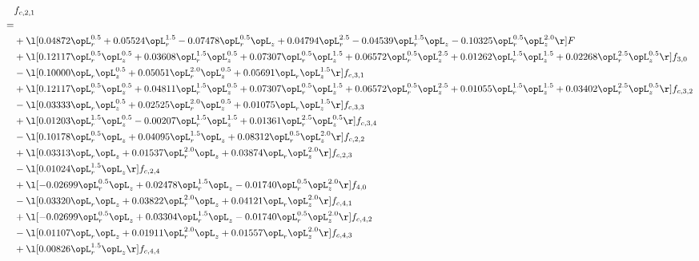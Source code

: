 \begin{alignat}{2} 
\label{eq:f_21_2} 
& f_{c,2,1} \nonumber \\ 
 = \\ 
& + \l[  0.04872 \opL_r^{0.5} +  0.05524 \opL_r^{1.5}   -0.07478 \opL_r^{0.5} \opL_z +  0.04794 \opL_r^{2.5}   -0.04539 \opL_r^{1.5} \opL_z   -0.10325 \opL_r^{0.5} \opL_z^{2.0}  \r] F \nonumber \\ 
& + \l[  0.12117 \opL_r^{0.5} \opL_z^{0.5} +  0.03608 \opL_r^{1.5} \opL_z^{0.5} +  0.07307 \opL_r^{0.5} \opL_z^{1.5} +  0.06572 \opL_r^{0.5} \opL_z^{2.5} +  0.01262 \opL_r^{1.5} \opL_z^{1.5} +  0.02268 \opL_r^{2.5} \opL_z^{0.5}  \r] f_{3,0} \nonumber \\ 
& - \l[  0.10000 \opL_r \opL_z^{0.5} +  0.05051 \opL_r^{2.0} \opL_z^{0.5} +  0.05691 \opL_r \opL_z^{1.5}  \r] f_{c,3,1} \nonumber \\ 
& + \l[  0.12117 \opL_r^{0.5} \opL_z^{0.5} +  0.04811 \opL_r^{1.5} \opL_z^{0.5} +  0.07307 \opL_r^{0.5} \opL_z^{1.5} +  0.06572 \opL_r^{0.5} \opL_z^{2.5} +  0.01055 \opL_r^{1.5} \opL_z^{1.5} +  0.03402 \opL_r^{2.5} \opL_z^{0.5}  \r] f_{c,3,2} \nonumber \\ 
& - \l[  0.03333 \opL_r \opL_z^{0.5} +  0.02525 \opL_r^{2.0} \opL_z^{0.5} +  0.01075 \opL_r \opL_z^{1.5}  \r] f_{c,3,3} \nonumber \\ 
& + \l[  0.01203 \opL_r^{1.5} \opL_z^{0.5}   -0.00207 \opL_r^{1.5} \opL_z^{1.5} +  0.01361 \opL_r^{2.5} \opL_z^{0.5}  \r] f_{c,3,4} \nonumber \\ 
& - \l[  0.10178 \opL_r^{0.5} \opL_z +  0.04095 \opL_r^{1.5} \opL_z +  0.08312 \opL_r^{0.5} \opL_z^{2.0}  \r] f_{c,2,2} \nonumber \\ 
& + \l[  0.03313 \opL_r \opL_z +  0.01537 \opL_r^{2.0} \opL_z +  0.03874 \opL_r \opL_z^{2.0}  \r] f_{c,2,3} \nonumber \\ 
& - \l[  0.01024 \opL_r^{1.5} \opL_z  \r] f_{c,2,4} \nonumber \\ 
& + \l[  -0.02699 \opL_r^{0.5} \opL_z +  0.02478 \opL_r^{1.5} \opL_z   -0.01740 \opL_r^{0.5} \opL_z^{2.0}  \r] f_{4,0} \nonumber \\ 
& - \l[  0.03320 \opL_r \opL_z +  0.03822 \opL_r^{2.0} \opL_z +  0.04121 \opL_r \opL_z^{2.0}  \r] f_{c,4,1} \nonumber \\ 
& + \l[  -0.02699 \opL_r^{0.5} \opL_z +  0.03304 \opL_r^{1.5} \opL_z   -0.01740 \opL_r^{0.5} \opL_z^{2.0}  \r] f_{c,4,2} \nonumber \\ 
& - \l[  0.01107 \opL_r \opL_z +  0.01911 \opL_r^{2.0} \opL_z +  0.01557 \opL_r \opL_z^{2.0}  \r] f_{c,4,3} \nonumber \\ 
& + \l[  0.00826 \opL_r^{1.5} \opL_z  \r] f_{c,4,4} \nonumber \\ 
\end{alignat} 



